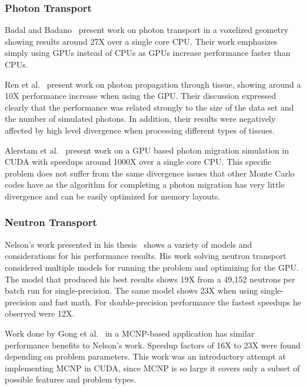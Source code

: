 \subsubsection*{\textbf{Photon Transport}}
%
Badal and Badano~\cite{badal2009accelerating} present work on photon transport in a voxelized geometry showing results around 27X over a single core CPU.
%
Their work emphasizes simply using GPUs instead of CPUs as GPUs increase performance faster than CPUs.
%

%
Ren et al.~\cite{ren2010gpu} present work on photon propagation through tissue, showing around a 10X performance increase when using the GPU.
%
Their discussion expressed clearly that the performance was related strongly to the size of the data set and the number of simulated photons.
%
In addition, their results were negatively affected by high level divergence when processing different types of tissues.
%

%
Alerstam et al.~\cite{alerstam2008parallel} present work on a GPU based photon migration simulation in CUDA with speedups around 1000X over a single core CPU.
%
This specific problem does not suffer from the same divergence issues that other Monte Carlo codes have as the algorithm for completing a photon migration has very little divergence and can be easily optimized for memory layouts.
%


\subsubsection*{\textbf{Neutron Transport}}

%
Nelson's work presented in his thesis~\cite{nelson2009monte} shows a variety of models and considerations for his performance results.
%
His work solving neutron transport considered multiple models for running the problem and optimizing for the GPU.
%
The model that produced his best results shows 19X from a 49,152 neutrons per batch run for single-precision.
%
The same model shows 23X when using single-precision and fast math.
%
For double-precision performance the fastest speedups he observed were 12X.
%

Work done by Gong et al.~\cite{gong2011accelerating} in a MCNP-based application has similar performance benefits to Nelson's work.
%
Speedup factors of 16X to 23X were found depending on problem parameters.
%
This work was an introductory attempt at implementing MCNP in CUDA, since MCNP is so large it covers only a subset of possible features and problem types.
%


